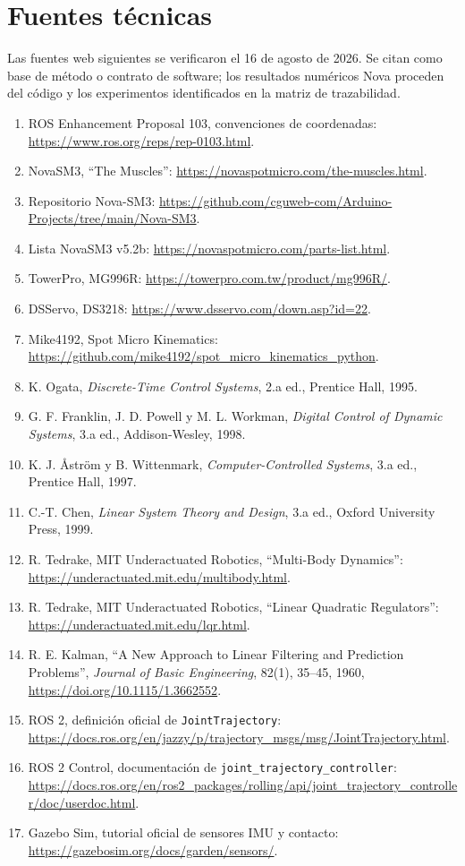 \documentclass[11pt,letterpaper]{article}
\begin{document}
\normalsize

\section{Fuentes técnicas}
Las fuentes web siguientes se verificaron el 16 de agosto de 2026. Se citan
como base de método o contrato de software; los resultados numéricos Nova
proceden del código y los experimentos identificados en la matriz de
trazabilidad.
\begin{enumerate}
 \item ROS Enhancement Proposal 103, convenciones de coordenadas:
 \url{https://www.ros.org/reps/rep-0103.html}.
 \item NovaSM3, ``The Muscles'': \url{https://novaspotmicro.com/the-muscles.html}.
 \item Repositorio Nova-SM3: \url{https://github.com/cguweb-com/Arduino-Projects/tree/main/Nova-SM3}.
 \item Lista NovaSM3 v5.2b: \url{https://novaspotmicro.com/parts-list.html}.
 \item TowerPro, MG996R: \url{https://towerpro.com.tw/product/mg996R/}.
 \item DSServo, DS3218: \url{https://www.dsservo.com/down.asp?id=22}.
 \item Mike4192, Spot Micro Kinematics: \url{https://github.com/mike4192/spot_micro_kinematics_python}.
 \item K. Ogata, \emph{Discrete-Time Control Systems}, 2.a ed., Prentice Hall, 1995.
 \item G. F. Franklin, J. D. Powell y M. L. Workman, \emph{Digital Control of
 Dynamic Systems}, 3.a ed., Addison-Wesley, 1998.
 \item K. J. \AA str\"om y B. Wittenmark, \emph{Computer-Controlled Systems},
 3.a ed., Prentice Hall, 1997.
 \item C.-T. Chen, \emph{Linear System Theory and Design}, 3.a ed., Oxford
 University Press, 1999.
 \item R. Tedrake, MIT Underactuated Robotics, ``Multi-Body Dynamics'':
 \url{https://underactuated.mit.edu/multibody.html}.
 \item R. Tedrake, MIT Underactuated Robotics, ``Linear Quadratic Regulators'':
 \url{https://underactuated.mit.edu/lqr.html}.
 \item R. E. Kalman, ``A New Approach to Linear Filtering and Prediction
 Problems'', \emph{Journal of Basic Engineering}, 82(1), 35--45, 1960,
 \url{https://doi.org/10.1115/1.3662552}.
 \item ROS 2, definición oficial de \texttt{JointTrajectory}:
 \url{https://docs.ros.org/en/jazzy/p/trajectory_msgs/msg/JointTrajectory.html}.
 \item ROS 2 Control, documentación de \texttt{joint\_trajectory\_controller}:
 \url{https://docs.ros.org/en/ros2_packages/rolling/api/joint_trajectory_controller/doc/userdoc.html}.
 \item Gazebo Sim, tutorial oficial de sensores IMU y contacto:
 \url{https://gazebosim.org/docs/garden/sensors/}.
\end{enumerate}
\end{document}
